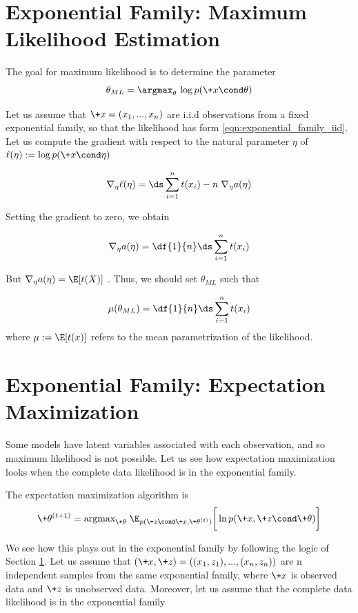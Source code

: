 \documentclass{article} %
\begin{document}
\section{Exponential Family: Maximum Likelihood Estimation} \label{sec:ml_with_ef}

The goal for maximum likelihood is to determine the parameter
\begin{equation}
\label{eqn:ml}
\theta_{ML} = \argmax_\theta  \, \log p(\+x \cond \theta) 
\end{equation}

Let us assume that $\+x=(x_1, ..., x_n)$ are i.i.d observations  from a fixed exponential family, so that the likelihood has form \eqref{eqn:exponential_family_iid}.  Let us compute the gradient with respect to the natural parameter $\eta$ of $\ell(\eta) := \log p(\+x \cond \eta)$

\[ \nabla_\eta \ell(\eta) = \ds\sum_{i=1}^n t(x_i) - n \; \nabla_\eta a(\eta) \]

Setting the gradient to zero, we obtain

\[ \nabla_\eta a(\eta) = \df{1}{n}  \ds\sum_{i=1}^n t(x_i) \]

But $\nabla_\eta a(\eta) = \E [t(X)]$ \cite{jordan_ef}.  Thus, we should set $\theta_{ML}$ such that

\[ \mu(\theta_{ML}) = \df{1}{n} \ds\sum_{i=1}^n t(x_i) \]
where $\mu := \E[t(x)]$ refers to the mean parametrization of the likelihood. 

 \section{Exponential Family: Expectation Maximization} \label{sec:em_with_ef}

Some models have latent variables associated with each observation, and so maximum likelihood is not possible.  Let us see how expectation maximization looks when the complete data likelihood is in the exponential family.

The expectation maximization algorithm is 
\begin{equation}
\label{eqn:em_algorithm_appendix}
 \+\theta^{(t+1)} =  \text{argmax}_{\+\theta} \; \E_{p(\+z \cond \+x , \+\theta^{(t)})} \bigg[ \ln p(\+x, \+z \cond \+\theta) \bigg] 
 \end{equation}

We see how this plays out in the exponential family by following the logic of Section \ref{sec:ml_with_ef}.   Let us assume that $(\+x, \+z)=((x_1,z_1), ..., (x_n, z_n))$ are n independent samples from the same exponential family, where $\+x$ is observed data and $\+z$ is unobserved data.
Moreover, let us assume that the complete data likelihood is in the exponential family
\end{document}
